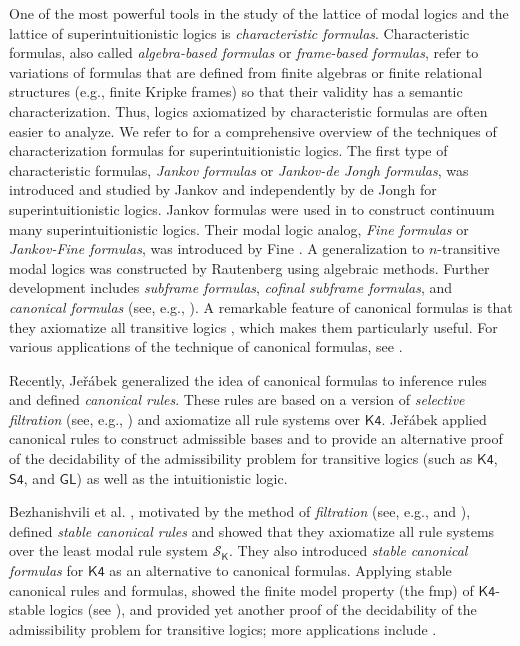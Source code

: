 \documentclass[a4paper,11pt]{article}
\theoremstyle{definition}
\theoremstyle{remark}
\numberwithin{theorem}{section}
\newcommand{\class}[1]{\mathcal{#1}}
\renewcommand{\S}{\class{S}}
\newcommand{\logic}[1]{\mathsf{#1}}
\newcommand{\K}{\logic{K}}
\newcommand{\Kf}{\logic{K4}}
\newcommand{\Sf}{\logic{S4}}
\renewcommand{\S}{\mathcal{S}}
\begin{document}
One of the most powerful tools in the study of the lattice of modal logics and the lattice of superintuitionistic logics is \emph{characteristic formulas}. Characteristic formulas, also called \emph{algebra-based formulas} or \emph{frame-based formulas}, refer to variations of formulas that are defined from finite algebras or finite relational structures (e.g., finite Kripke frames) so that their validity has a semantic characterization. Thus, logics axiomatized by characteristic formulas are often easier to analyze. We refer to \cite{JankovFormulasAxiomatization2022b} for a comprehensive overview of the techniques of characterization formulas for superintuitionistic logics. The first type of characteristic formulas, \emph{Jankov formulas} or \emph{Jankov-de Jongh formulas}, was introduced and studied by Jankov \cite{jankov1963} and independently by de Jongh \cite{dejongh1968} for superintuitionistic logics. Jankov formulas were used in \cite{jankov1963} to construct continuum many superintuitionistic logics. Their modal logic analog, \emph{Fine formulas} or \emph{Jankov-Fine formulas}, was introduced by Fine \cite{fineK4I}. A generalization to $n$-transitive modal logics was constructed by Rautenberg \cite{rautenbergSplittingLatticesLogics1980} using algebraic methods. Further development includes \emph{subframe formulas}, \emph{cofinal subframe formulas}, and \emph{canonical formulas} (see, e.g., \cite[Chapter 9]{czModalLogic1997}). A remarkable feature of canonical formulas is that they axiomatize all transitive logics \cite{zakharyaschevCanonicalFormulas1}, which makes them particularly useful. For various applications of the technique of canonical formulas, see \cite[Chapters 9-16]{czModalLogic1997}. 

Recently, Je\v r\'abek \cite{Jeřábek_2009} generalized the idea of canonical formulas to inference rules and defined \emph{canonical rules}. These rules are based on a version of \emph{selective filtration} (see, e.g., \cite[Section 9.3]{czModalLogic1997}) and axiomatize all rule systems over $\Kf$. Je\v r\'abek \cite{Jeřábek_2009} applied canonical rules to construct admissible bases and to provide an alternative proof of the decidability of the admissibility problem for transitive logics (such as $\Kf$, $\Sf$, and $\logic{GL}$) as well as the intuitionistic logic. 

Bezhanishvili et al. \cite{stablecanonicalrules}, motivated by the method of \emph{filtration} (see, e.g., \cite[Section 2.3]{blackburnModalLogic2001} and \cite[Section 5.3]{czModalLogic1997}), defined \emph{stable canonical rules} and showed that they axiomatize all rule systems over the least modal rule system $\S_\K$. They also introduced \emph{stable canonical formulas} for $\Kf$ as an alternative to canonical formulas. Applying stable canonical rules and formulas, \cite{stablemodallogic} showed the finite model property (the fmp) of $\Kf$-stable logics (see ), and \cite{admissiblebases} provided yet another proof of the decidability of the admissibility problem for transitive logics; more applications include \cite{BezhanishviliGhilardi2014,BLOKESAKIATHEOREMSSTABLE2025a}.
\end{document}
